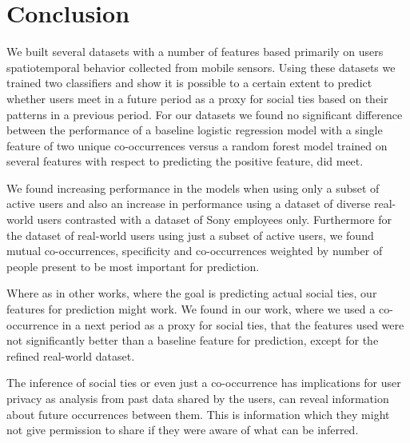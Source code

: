 \chapter{Conclusion}
\label{chap:conclusion}
We built several datasets with a number of features based primarily on users spatiotemporal behavior collected from mobile sensors. Using these datasets we trained two classifiers and show it is possible to a certain extent to predict whether users meet in a future period as a proxy for social ties based on their patterns in a previous period. For our datasets we found no significant difference between the performance of a baseline logistic regression model with a single feature of two unique co-occurrences versus a random forest model trained on several features with respect to predicting the positive feature, did meet.

We found increasing performance in the models when using only a subset of active users and also an increase in performance using a dataset of diverse real-world users contrasted with a dataset of Sony employees only. Furthermore for the dataset of real-world users using just a subset of active users, we found mutual co-occurrences, specificity and co-occurrences weighted by number of people present to be most important for prediction.

Where as in other works, where the goal is predicting actual social ties, our features for prediction might work. We found in our work, where we used a co-occurrence in a next period as a proxy for social ties, that the features used were not significantly better than a baseline feature for prediction, except for the refined real-world dataset.

The inference of social ties or even just a co-occurrence has implications for user privacy as analysis from past data shared by the users, can reveal information about future occurrences between them. This is information which they might not give permission to share if they were aware of what can be inferred.